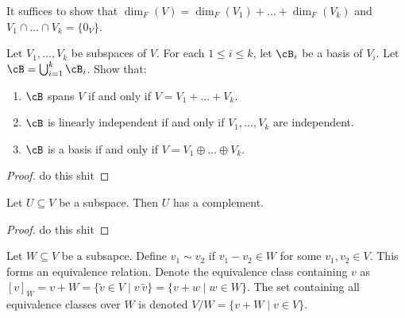     \begin{note}
        It suffices to show that $\dim_F(V) = \dim_F(V_1) + ... + \dim_F(V_k)$ and $V_1 \cap ... \cap V_k = \{0_V\}$.
    \end{note}

    \begin{exercise}
        Let $V_1,...,V_k$ be subspaces of $V$. For each $1\leq i \leq k$, let $\cB_i$ be a basis of $V_i$. Let $\cB = \bigcup_{i = 1}^k \cB_i$. Show that:
            \begin{enumerate}[label = (\arabic*)]
                \item $\cB$ spans $V$ if and only if $V = V_1 + ... + V_k$.
                \item $\cB$ is linearly independent if and only if $V_1,...,V_k$ are independent.
                \item $\cB$ is a basis if and only if $V = V_1 \oplus ... \oplus V_k$.
            \end{enumerate}
    \end{exercise}
        \begin{proof}
            \color{red} do this shit
        \end{proof}

    \begin{lemma}
        Let $U \subseteq V$ be a subspace. Then $U$ has a complement.
    \end{lemma}
        \begin{proof}
            \color{red} do this shit
        \end{proof}

    \begin{definition}
        Let $W \subseteq V$ be a subsapce. Define $v_1 \sim v_2$ if $v_1 - v_2 \in W$ for some $v_1,v_2 \in V$. This forms an equivalence relation. Denote the equivalence class containing $v$ as $[v]_W = v + W = \{\tilde{v} \in V \mid v ~ \tilde{v}\} = \{v+w \mid w \in W\}$. The set containing all equivalence classes over $W$ is denoted $V/W = \{v + W \mid v \in V\}$.
    \end{definition}

